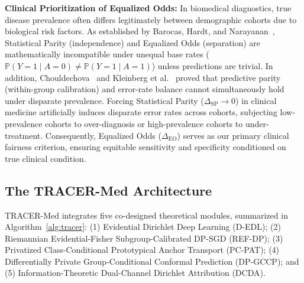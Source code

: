 \documentclass[pdflatex,sn-vancouver-num,referee,lineno]{sn-jnl}
\theoremstyle{thmstyleone}
\theoremstyle{thmstylethree}
\begin{document}
\noindent \textbf{Clinical Prioritization of Equalized Odds:} In biomedical diagnostics, true disease prevalence often differs legitimately between demographic cohorts due to biological risk factors. As established by Barocas, Hardt, and Narayanan~\cite{barocas2019fairness}, Statistical Parity (independence) and Equalized Odds (separation) are mathematically incompatible under unequal base rates ($\mathbb{P}(Y = 1 \mid A = 0) \neq \mathbb{P}(Y = 1 \mid A = 1)$) unless predictions are trivial. In addition, Chouldechova~\cite{chouldechova2017fair} and Kleinberg et al.~\cite{kleinberg2016inherent} proved that predictive parity (within-group calibration) and error-rate balance cannot simultaneously hold under disparate prevalence. Forcing Statistical Parity ($\Delta_{\text{SP}} \to 0$) in clinical medicine artificially induces disparate error rates across cohorts, subjecting low-prevalence cohorts to over-diagnosis or high-prevalence cohorts to under-treatment. Consequently, Equalized Odds ($\Delta_{\text{EO}}$) serves as our primary clinical fairness criterion, ensuring equitable sensitivity and specificity conditioned on true clinical condition.

\subsection{The TRACER-Med Architecture}
\label{sec:method}

TRACER-Med integrates five co-designed theoretical modules, summarized in Algorithm~\ref{alg:tracer}: (1) Evidential Dirichlet Deep Learning (D-EDL); (2) Riemannian Evidential-Fisher Subgroup-Calibrated DP-SGD (REF-DP); (3) Privatized Class-Conditional Prototypical Anchor Transport (PC-PAT); (4) Differentially Private Group-Conditional Conformal Prediction (DP-GCCP); and (5) Information-Theoretic Dual-Channel Dirichlet Attribution (DCDA).
\end{document}
